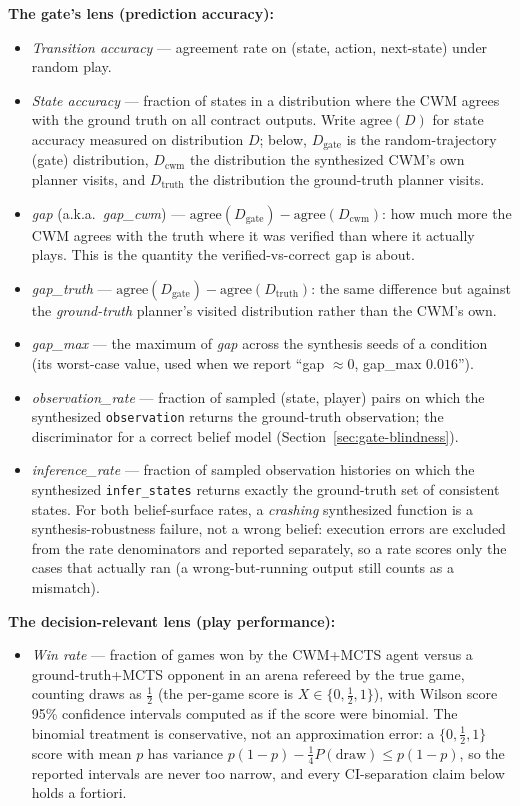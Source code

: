 \documentclass[11pt]{article}
\theoremstyle{remark}
\begin{document}
\textbf{The gate's lens (prediction accuracy):}
\begin{itemize}
\item \emph{Transition accuracy} --- agreement rate on (state, action, next-state) under random play.
\item \emph{State accuracy} --- fraction of states in a distribution where the CWM agrees with the ground truth on all contract outputs. Write $\mathrm{agree}(D)$ for state accuracy measured on distribution $D$; below, $D_{\text{gate}}$ is the random-trajectory (gate) distribution, $D_{\text{cwm}}$ the distribution the synthesized CWM's own planner visits, and $D_{\text{truth}}$ the distribution the ground-truth planner visits.
\item \emph{gap} (a.k.a.\ \emph{gap\_cwm}) --- $\mathrm{agree}(D_{\text{gate}}) - \mathrm{agree}(D_{\text{cwm}})$: how much more the CWM agrees with the truth where it was verified than where it actually plays. This is the quantity the verified-vs-correct gap is about.
\item \emph{gap\_truth} --- $\mathrm{agree}(D_{\text{gate}}) - \mathrm{agree}(D_{\text{truth}})$: the same difference but against the \emph{ground-truth} planner's visited distribution rather than the CWM's own.
\item \emph{gap\_max} --- the maximum of \emph{gap} across the synthesis seeds of a condition (its worst-case value, used when we report ``gap $\approx 0$, gap\_max $0.016$'').
\item \emph{observation\_rate} --- fraction of sampled (state, player) pairs on which the synthesized \texttt{observation} returns the ground-truth observation; the discriminator for a correct belief model (Section~\ref{sec:gate-blindness}).
\item \emph{inference\_rate} --- fraction of sampled observation histories on which the synthesized \texttt{infer\_states} returns exactly the ground-truth set of consistent states. For both belief-surface rates, a \emph{crashing} synthesized function is a synthesis-robustness failure, not a wrong belief: execution errors are excluded from the rate denominators and reported separately, so a rate scores only the cases that actually ran (a wrong-but-running output still counts as a mismatch).
\end{itemize}

\textbf{The decision-relevant lens (play performance):}
\begin{itemize}
\item \emph{Win rate} --- fraction of games won by the CWM+MCTS agent versus a ground-truth+MCTS opponent in an arena refereed by the true game, counting draws as $\tfrac12$ (the per-game score is $X \in \{0, \tfrac12, 1\}$), with Wilson score 95\% confidence intervals \citep{wilson1927} computed as if the score were binomial. The binomial treatment is conservative, not an approximation error: a $\{0, \tfrac12, 1\}$ score with mean $p$ has variance $p(1-p) - \tfrac14 P(\mathrm{draw}) \leq p(1-p)$, so the reported intervals are never too narrow, and every CI-separation claim below holds a fortiori.
\end{itemize}
\end{document}
